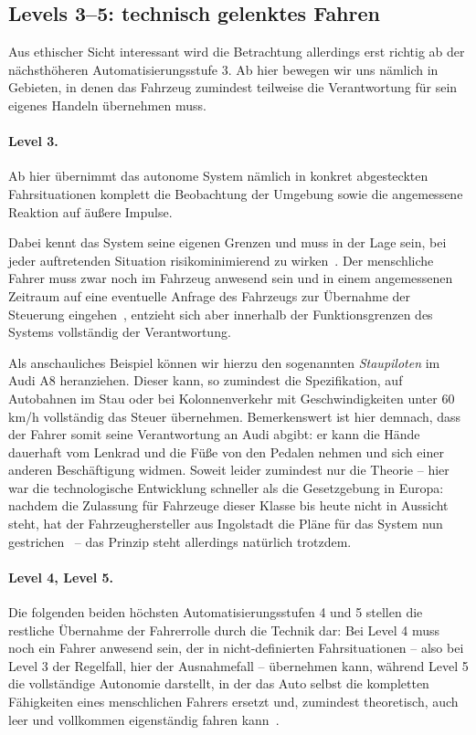 \documentclass[twocolumn, german]{tum-article}
\begin{document}
\subsection{Levels 3--5: technisch gelenktes Fahren}
Aus ethischer Sicht interessant wird die Betrachtung allerdings erst richtig ab der nächsthöheren Automatisierungsstufe 3.
Ab hier bewegen wir uns nämlich in Gebieten, in denen das Fahrzeug zumindest teilweise die Verantwortung für sein eigenes Handeln übernehmen muss.

\paragraph{Level 3.}
Ab hier übernimmt das autonome System nämlich in konkret abgesteckten Fahrsituationen komplett die Beobachtung der Umgebung sowie die angemessene Reaktion auf äußere Impulse.
	
Dabei kennt das System seine eigenen Grenzen und muss in der Lage sein, bei jeder auftretenden Situation risikominimierend zu wirken~\cite[S. 1]{bast-levels}.
Der menschliche Fahrer muss zwar noch im Fahrzeug anwesend sein und in einem angemessenen Zeitraum auf eine eventuelle Anfrage des Fahrzeugs zur Übernahme der Steuerung eingehen~\cite[S. 8]{cedr-levels}, entzieht sich aber innerhalb der Funktionsgrenzen des Systems vollständig der Verantwortung.

Als anschauliches Beispiel können wir hierzu den sogenannten \emph{Staupiloten} im Audi A8 heranziehen.
Dieser kann, so zumindest die Spezifikation, auf Autobahnen im Stau oder bei Kolonnenverkehr mit Geschwindigkeiten unter 60 km/h vollständig das Steuer übernehmen.
Bemerkenswert ist hier demnach, dass der Fahrer somit seine Verantwortung an Audi abgibt: er kann die Hände dauerhaft vom Lenkrad und die Füße von den Pedalen nehmen und sich einer anderen Beschäftigung widmen.
Soweit leider zumindest nur die Theorie -- hier war die technologische Entwicklung schneller als die Gesetzgebung in Europa: nachdem die Zulassung für Fahrzeuge dieser Klasse bis heute nicht in Aussicht steht, hat der Fahrzeughersteller aus Ingolstadt die Pläne für das System nun gestrichen~\cite{audi-no-more-staupilot} -- das Prinzip steht allerdings natürlich trotzdem.
	
\paragraph{Level 4, Level 5.}
Die folgenden beiden höchsten Automatisierungsstufen 4 und 5 stellen die restliche Übernahme der Fahrerrolle durch die Technik dar:
Bei Level 4 muss noch ein Fahrer anwesend sein, der in nicht-definierten Fahrsituationen -- also bei Level 3 der Regelfall, hier der Ausnahmefall -- übernehmen kann, während Level 5 die vollständige Autonomie darstellt, in der das Auto selbst die kompletten Fähigkeiten eines menschlichen Fahrers ersetzt und, zumindest theoretisch, auch leer und vollkommen eigenständig fahren kann~\cite[S. 8]{cedr-levels}.
\end{document}
